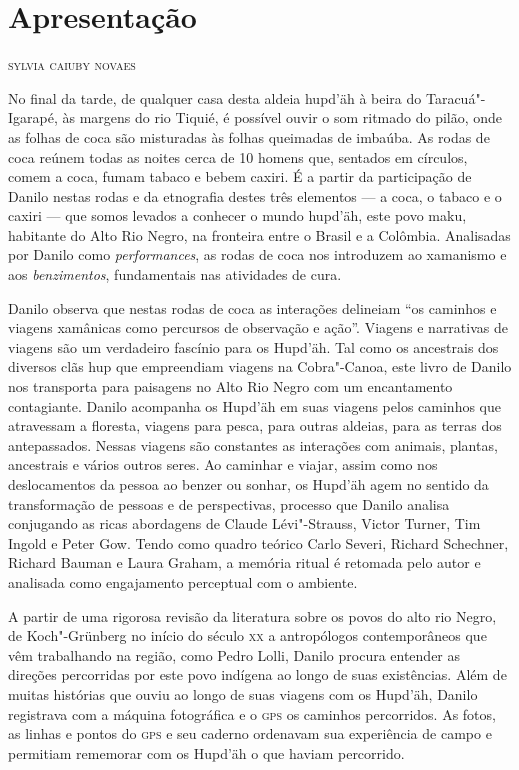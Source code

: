 \chapter[Apresentação]{Apresentação}

\begin{flushright}
\textsc{sylvia caiuby novaes}
\end{flushright}

\noindent{}No final da tarde, de qualquer casa desta aldeia hupd'äh à beira do
Taracuá"-Igarapé, às margens do rio Tiquié, é possível ouvir o som
ritmado do pilão, onde as folhas de coca são misturadas às folhas
queimadas de imbaúba. As rodas de coca reúnem todas as noites cerca de
10 homens que, sentados em círculos, comem a coca, fumam tabaco e bebem
caxiri. É a partir da participação de Danilo nestas rodas e da
etnografia destes três elementos --- a coca, o tabaco e o caxiri --- que
somos levados a conhecer o mundo hupd'äh, este povo maku, habitante do
Alto Rio Negro, na fronteira entre o Brasil e a Colômbia. Analisadas por
Danilo como \textit{performances}, as rodas de coca nos introduzem ao
xamanismo e aos \textit{benzimentos}, fundamentais nas atividades de cura.

Danilo observa que nestas rodas de coca as interações delineiam ``os
caminhos e viagens xamânicas como percursos de observação e ação''.
Viagens e narrativas de viagens são um verdadeiro fascínio para os
Hupd'äh. Tal como os ancestrais dos diversos clãs hup que empreendiam
viagens na Cobra"-Canoa, este livro de Danilo nos transporta para
paisagens no Alto Rio Negro com um encantamento contagiante. Danilo
acompanha os Hupd'äh em suas viagens pelos caminhos que atravessam a
floresta, viagens para pesca, para outras aldeias, para as terras dos
antepassados. Nessas viagens são constantes as interações com animais,
plantas, ancestrais e vários outros seres. Ao caminhar e viajar, assim
como nos deslocamentos da pessoa ao benzer ou sonhar, os Hupd'äh agem no
sentido da transformação de pessoas e de perspectivas, processo que
Danilo analisa conjugando as ricas abordagens de Claude Lévi"-Strauss,
Victor Turner, Tim Ingold e Peter Gow. Tendo como quadro teórico Carlo
Severi, Richard Schechner, Richard Bauman e Laura Graham, a memória
ritual é retomada pelo autor e analisada como engajamento perceptual com
o ambiente.

A partir de uma rigorosa revisão da literatura sobre os povos do alto
rio Negro, de Koch"-Grünberg no início do século \textsc{xx} a antropólogos
contemporâneos que vêm trabalhando na região, como Pedro Lolli, Danilo
procura entender as direções percorridas por este povo indígena ao longo
de suas existências. Além de muitas histórias que ouviu ao longo de suas
viagens com os Hupd'äh, Danilo registrava com a máquina fotográfica e o
\textsc{gps} os caminhos percorridos. As fotos, as linhas e pontos do \textsc{gps} e seu
caderno ordenavam sua experiência de campo e permitiam rememorar com os
Hupd'äh o que haviam percorrido.


